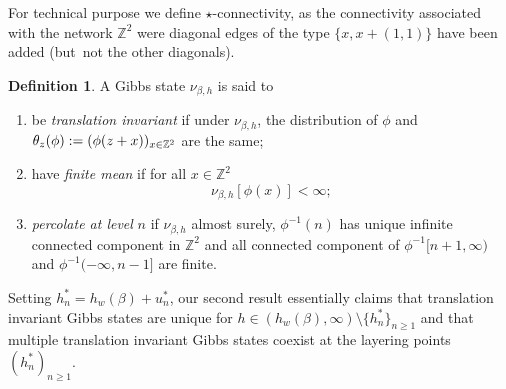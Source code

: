 \documentclass[10pt]{amsart}
\newenvironment{enumeratei}
{\bgroup\def\theenumi{\roman{enumi}}\def\theenumii{\Alph{enumii}}\begin{enumerate}}
{\end{enumerate}\egroup}
\numberwithin{equation}{section}
\theoremstyle{plain}
\theoremstyle{definition}
\newtheorem{definition}[theorem]{Definition}
\newcommand{\bbZ}{{\ensuremath{\mathbb Z}} }
\newcommand{\gb}{\beta}
\begin{document}
For technical purpose we define $\star$-connectivity, as the connectivity associated with the network $\bbZ^2$ were diagonal edges of the type
$\{x,x+(1,1)\}$ have been added (but~not the other diagonals).

\begin{definition}
A Gibbs state $\nu_{\gb,h}$ is said to
\begin{enumeratei}
\item
be \textit{translation invariant} if under $\nu_{\gb,h}$, the distribution of $\phi$ and $\theta_z(\phi):= (\phi(z+\nobreak x))_{x\in \bbZ^2}$
are the same;
\item
have \textit{finite mean} if for all $x\in \bbZ^2$
\begin{equation*}%
\nu_{\gb,h}\left[ \phi(x) \right]<\infty;
\end{equation*}
\item
\textit{percolate at level} $n$ if $\nu_{\gb,h}$ almost surely, $\phi^{-1}(n)$ has unique infinite connected component in $\bbZ^2$
and all connected component of $\phi^{-1}[n+1,\infty)$ and $\phi^{-1}(-\infty,n-1]$ are finite.
\end{enumeratei}
\end{definition}

Setting $h^*_n=h_w(\gb)+u^*_n$,
our second result essentially claims that translation invariant Gibbs states are unique for $h\in (h_w(\gb),\infty)\setminus \{h^*_n\}_{n\ge 1}$
and that multiple translation invariant Gibbs states coexist at the layering points $(h^*_n)_{n\ge 1}$.
\end{document}
